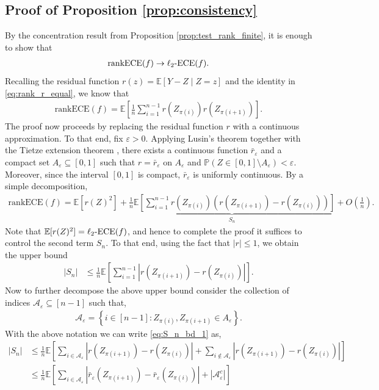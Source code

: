 \documentclass[11pt]{article}
\numberwithin{equation}{section}
\theoremstyle{definition}
\newcommand{\E}{\mathbb{E}}
\renewcommand{\P}{\mathbb{P}}
\newcommand{\cA}{\mathcal{A}}
\newcommand{\ra}{\rightarrow}
\newcommand{\vep}{\varepsilon}
\newcommand{\ECE}{\mathrm{ECE}}
\newcommand{\lECE}{\ell_2\textnormal{-}\ECE}
\newcommand{\rankECE}{\mathrm{rankECE}}
\begin{document}
\subsection{Proof of Proposition \ref{prop:consistency}}\label{sec:proofof_prop_consistency}
By the concentration result from Proposition \ref{prop:test_rank_finite}, it is enough to show that
\begin{align*}
    \rankECE(f)\ra \lECE(f).
\end{align*}
Recalling the residual function $r(z) = \E[Y-Z\mid Z = z]$ and the identity in \eqref{eq:rank_r_equal}, we know that
\begin{align*}
    \rankECE(f) = \E\left[\frac{1}{n}\sum_{i=1}^{n-1}r\left(Z_{\pi(i)}\right)r\left(Z_{\pi(i+1)}\right)\right].
\end{align*}
The proof now proceeds by replacing the residual function $r$ with a continuous approximation. To that end, fix $\vep>0$. Applying Lusin's theorem together with the Tietze extension theorem \citep{dugundji1951extension,mcshane1934extension}, there exists a continuous function $\bar r_\vep$ and a compact set $A_\vep\subseteq[0,1]$ such that $r = \bar r_\vep$ on $A_\vep$ and $\P(Z\in [0,1]\setminus A_\vep)<\vep$. Moreover, since the interval $[0,1]$ is compact, $\bar r_\vep$ is uniformly continuous. By a simple decomposition,
\begin{align}\label{eq:rankECE_decomp_consistency}
    \rankECE(f) = \E\left[r(Z)^2\right] + \underbrace{\frac{1}{n}\E\left[\sum_{i=1}^{n-1}r\left(Z_{\pi(i)}\right)\left(r\left(Z_{\pi(i+1)}\right) - r\left(Z_{\pi(i)}\right)\right)\right]}_{S_n} + O\left(\frac{1}{n}\right).
\end{align}
Note that $\E[r(Z)^2] = \lECE(f)$, and hence to complete the proof it suffices to control the second term $S_n$. To that end, using the fact that $|r|\leq 1$, we obtain the upper bound
\begin{align}\label{eq:S_n_bd_1}
    |S_n|
    & \leq \frac{1}{n}\E\left[\sum_{i=1}^{n-1}\left|r\left(Z_{\pi(i+1)}\right) - r\left(Z_{\pi(i)}\right)\right|\right].
\end{align}
Now to further decompose the above upper bound consider the collection of indices $\cA_\vep\subseteq [n-1]$ such that,
\begin{align*}
    \cA_\vep = \left\{i\in [n-1]: Z_{\pi(i)},Z_{\pi(i+1)}\in A_\vep\right\}.
\end{align*}
With the above notation we can write \eqref{eq:S_n_bd_1} as,
\begin{align*}
    |S_n|
    &\leq \frac{1}{n}\E\left[\sum_{i\in \cA_\vep}\left|r\left(Z_{\pi(i+1)}\right) - r\left(Z_{\pi(i)}\right)\right| + \sum_{i\not\in\cA_\vep}\left|r\left(Z_{\pi(i+1)}\right) - r\left(Z_{\pi(i)}\right)\right|\right]\\
    &\leq \frac{1}{n}\E\left[\sum_{i\in \cA_\vep}\left|\bar r_\vep\left(Z_{\pi(i+1)}\right) - \bar r_\vep\left(Z_{\pi(i)}\right)\right| + \left|\cA_\vep^c\right|\right]
\end{align*}
\end{document}
